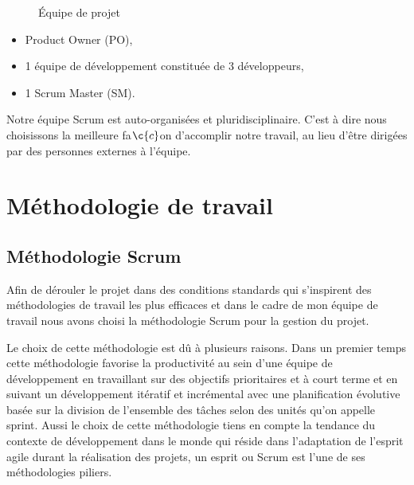 \begin{figure}[!htb]
	\caption{\label{fig:my-label} \'Equipe de projet}
\end{figure}

\begin{itemize}
\item Product Owner (PO),
\item 1 \'equipe de d\'eveloppement constitu\'ee de 3 d\'eveloppeurs,
\item 1 Scrum Master (SM).
\end{itemize}

Notre \'equipe Scrum est auto-organis\'ees et pluridisciplinaire. C'est \`a dire nous choisissons la meilleure fa${\c{c}}$on d'accomplir notre travail, au lieu d'\^etre dirig\'ees par des personnes externes \`a l'\'equipe.

\section{M\'ethodologie de travail}
\subsection{M\'ethodologie Scrum}
Afin de d\'erouler le projet dans des conditions standards qui s'inspirent des m\'ethodologies de travail les plus efficaces et dans le cadre de mon \'equipe de travail nous avons choisi la m\'ethodologie Scrum pour la gestion du projet.

Le choix de cette m\'ethodologie est d\^u \`a plusieurs raisons. Dans un premier temps cette m\'ethodologie favorise la productivit\'e au sein d'une \'equipe de d\'eveloppement en travaillant sur des objectifs prioritaires et \`a court terme et en suivant un d\'eveloppement it\'eratif et incr\'emental avec une planification \'evolutive bas\'ee sur la division de l'ensemble des t\^aches selon des unit\'es qu'on appelle sprint. Aussi le choix de cette m\'ethodologie tiens en compte la tendance du contexte de d\'eveloppement dans le monde qui r\'eside dans l'adaptation de l'esprit agile durant la r\'ealisation des projets, un esprit ou Scrum est l'une de ses m\'ethodologies piliers.

